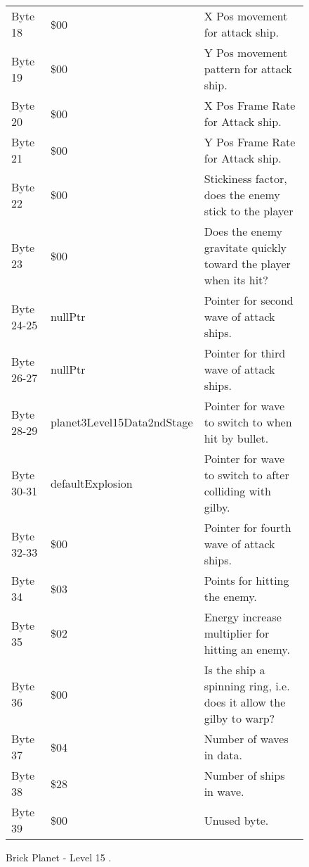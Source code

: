 \begin{figure}[H]
{\begin{adjustbox}{width=12cm}
\begin{tabular}{lll}
 Byte 18    & \$00                        & X Pos movement for attack ship.                                     \\
 Byte 19    & \$00                        & Y Pos movement pattern for attack ship.                             \\
 Byte 20    & \$00                        & X Pos Frame Rate for Attack ship.                                   \\
 Byte 21    & \$00                        & Y Pos Frame Rate for Attack ship.                                   \\
 Byte 22    & \$00                        & Stickiness factor, does the enemy stick to the player               \\
 Byte 23    & \$00                        & Does the enemy gravitate quickly toward the player when its hit?    \\
 Byte 24-25 & nullPtr                    & Pointer for second wave of attack ships.                            \\
 Byte 26-27 & nullPtr                    & Pointer for third wave of attack ships.                             \\
 Byte 28-29 & planet3Level15Data2ndStage & Pointer for wave to switch to when hit by bullet.                   \\
 Byte 30-31 & defaultExplosion           & Pointer for  wave to switch to after colliding with gilby.          \\
 Byte 32-33 & \$00                        & Pointer for fourth wave of attack ships.                            \\
 Byte 34    & \$03                        & Points for hitting the enemy.                                       \\
 Byte 35    & \$02                        & Energy increase multiplier for hitting an enemy.                    \\
 Byte 36    & \$00                        & Is the ship a spinning ring, i.e. does it allow the gilby to warp?  \\
 Byte 37    & \$04                        & Number of waves in data.                                            \\
 Byte 38    & \$28                        & Number of ships in wave.                                            \\
 Byte 39    & \$00                        & Unused byte.                                                        \\
\bottomrule
\end{tabular}

  \end{adjustbox}

  }\caption*{Brick Planet - Level 15
.}
\end{figure}

